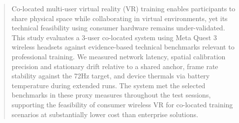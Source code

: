 \begin{abstract}
  Co-located multi-user virtual reality (VR) training enables participants to share physical space while collaborating in virtual environments, yet its technical feasibility using consumer hardware remains under-validated. This study evaluates a 3-user co-located system using Meta Quest 3 wireless headsets against evidence-based technical benchmarks relevant to professional training. We measured network latency, spatial calibration precision and stationary drift relative to a shared anchor, frame rate stability against the 72Hz target, and device thermals via battery temperature during extended runs. The system met the selected benchmarks in these proxy measures throughout the test sessions, supporting the feasibility of consumer wireless VR for co-located training scenarios at substantially lower cost than enterprise solutions.
\end{abstract}